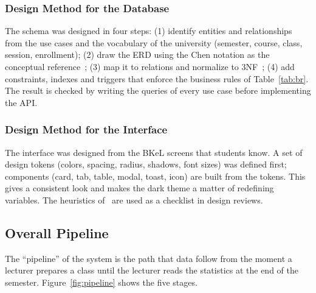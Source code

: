 \subsubsection{Design Method for the Database}

The schema was designed in four steps: (1) identify entities and relationships from the use cases and the vocabulary of the university (semester, course, class, session, enrollment); (2) draw the ERD using the Chen notation as the conceptual reference~\cite{chen1976entity}; (3) map it to relations and normalize to 3NF~\cite{codd1970relational, silberschatz2019database}; (4) add constraints, indexes and triggers that enforce the business rules of Table~\ref{tab:br}. The result is checked by writing the queries of every use case before implementing the API.

\subsubsection{Design Method for the Interface}

The interface was designed from the BKeL screens that students know. A set of design tokens (colors, spacing, radius, shadows, font sizes) was defined first; components (card, tab, table, modal, toast, icon) are built from the tokens. This gives a consistent look and makes the dark theme a matter of redefining variables. The heuristics of~\cite{nielsen1993usability} are used as a checklist in design reviews.

\subsection{Overall Pipeline}
\label{sec:pipeline}

The ``pipeline'' of the system is the path that data follow from the moment a lecturer prepares a class until the lecturer reads the statistics at the end of the semester. Figure~\ref{fig:pipeline} shows the five stages.

